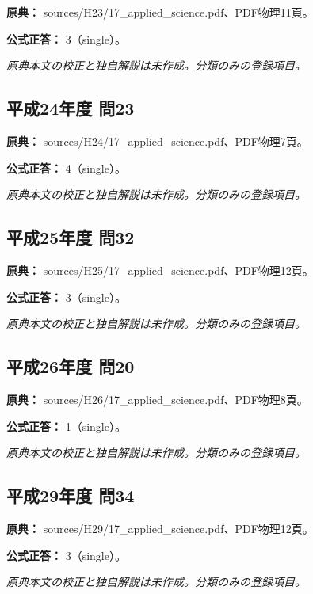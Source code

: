 \noindent\textbf{原典：} sources/H23/17\_applied\_science.pdf、PDF物理11頁。

\textbf{公式正答：} 3（single）。

\par\textit{原典本文の校正と独自解説は未作成。分類のみの登録項目。}

\subsection{平成24年度 問23}
\label{q:h24-reg-applied-23}

\noindent\textbf{原典：} sources/H24/17\_applied\_science.pdf、PDF物理7頁。

\textbf{公式正答：} 4（single）。

\par\textit{原典本文の校正と独自解説は未作成。分類のみの登録項目。}

\subsection{平成25年度 問32}
\label{q:h25-reg-applied-32}

\noindent\textbf{原典：} sources/H25/17\_applied\_science.pdf、PDF物理12頁。

\textbf{公式正答：} 3（single）。

\par\textit{原典本文の校正と独自解説は未作成。分類のみの登録項目。}

\subsection{平成26年度 問20}
\label{q:h26-reg-applied-20}

\noindent\textbf{原典：} sources/H26/17\_applied\_science.pdf、PDF物理8頁。

\textbf{公式正答：} 1（single）。

\par\textit{原典本文の校正と独自解説は未作成。分類のみの登録項目。}

\subsection{平成29年度 問34}
\label{q:h29-reg-applied-34}

\noindent\textbf{原典：} sources/H29/17\_applied\_science.pdf、PDF物理12頁。

\textbf{公式正答：} 3（single）。

\par\textit{原典本文の校正と独自解説は未作成。分類のみの登録項目。}

